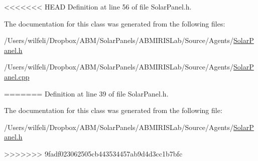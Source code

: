 <<<<<<< HEAD
Definition at line 56 of file Solar\+Panel.\+h.



The documentation for this class was generated from the following files\+:\begin{DoxyCompactItemize}
\item 
/\+Users/wilfeli/\+Dropbox/\+A\+B\+M/\+Solar\+Panels/\+A\+B\+M\+I\+R\+I\+S\+Lab/\+Source/\+Agents/\hyperlink{_solar_panel_8h}{Solar\+Panel.\+h}\item 
/\+Users/wilfeli/\+Dropbox/\+A\+B\+M/\+Solar\+Panels/\+A\+B\+M\+I\+R\+I\+S\+Lab/\+Source/\+Agents/\hyperlink{_solar_panel_8cpp}{Solar\+Panel.\+cpp}\end{DoxyCompactItemize}
=======
Definition at line 39 of file Solar\+Panel.\+h.



The documentation for this class was generated from the following file\+:\begin{DoxyCompactItemize}
\item 
/\+Users/wilfeli/\+Dropbox/\+A\+B\+M/\+Solar\+Panels/\+A\+B\+M\+I\+R\+I\+S\+Lab/\+Source/\+Agents/\hyperlink{_solar_panel_8h}{Solar\+Panel.\+h}\end{DoxyCompactItemize}
>>>>>>> 9fadf023062505cb443534457ab9d4d3cc1b7bfc
